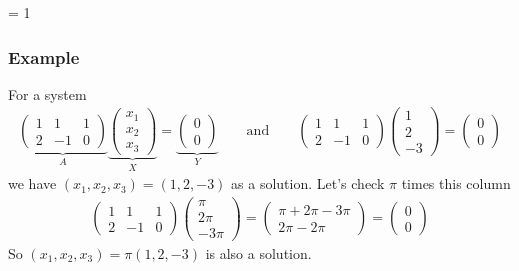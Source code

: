 \documentclass[usenames,dvipsnames,aspectratio=169,10pt]{beamer}
\def \EXAMPLEVERSION {1} %
\numberwithin{equation}{section}
\begin{document}
\ifnum \EXAMPLEVERSION = 1
\begin{frame}
\frametitle{Example}
For a system
\begin{align*}
\underbrace{
\begin{pmatrix}
1 &  1 & 1 \\
2 & -1 & 0
\end{pmatrix}}_A
\underbrace{
\begin{pmatrix}
x_{1} \\
x_{2} \\
x_{3}
\end{pmatrix}}_X
=
\underbrace{
\begin{pmatrix}
0 \\
0
\end{pmatrix}}_Y
\qquad \text{and} \qquad
\begin{pmatrix}
1 &  1 & 1 \\
2 & -1 & 0
\end{pmatrix}
\begin{pmatrix}
1 \\
2 \\
-3
\end{pmatrix}
=
\begin{pmatrix}
0 \\
0
\end{pmatrix}
\end{align*}
we have $(x_1,x_2,x_3)=(1,2,-3)$ as a solution. Let's check $\pi$ times this column
\begin{align*}
\begin{pmatrix}
1 &  1 & 1 \\
2 & -1 & 0
\end{pmatrix}
\begin{pmatrix}
\pi \\
2\pi \\
-3\pi
\end{pmatrix}
=
\begin{pmatrix}
\pi + 2\pi - 3\pi \\
2\pi - 2\pi
\end{pmatrix}
=
\begin{pmatrix}
0 \\
0
\end{pmatrix}
\end{align*}
So $(x_1,x_2,x_3)=\pi(1,2,-3)$ is also a solution.
\end{frame}
\fi 
\end{document}
